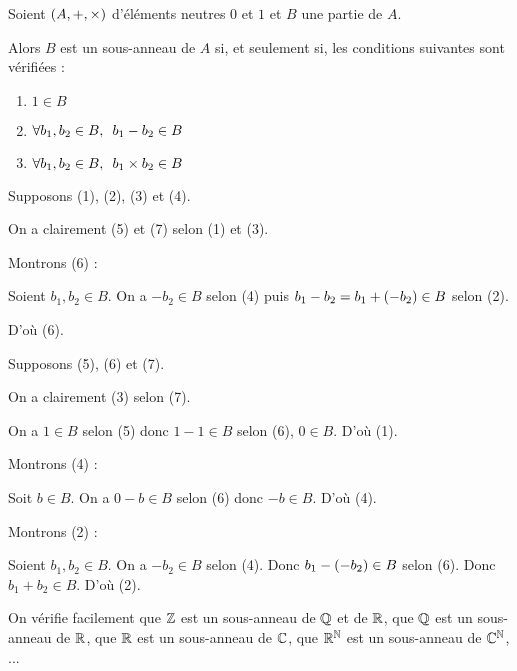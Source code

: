 \begin{prop}
Soient \(\anneau{A}\) d'éléments neutres \(0\) et \(1\) et \(B\) une partie de \(A\).

Alors \(B\) est un sous-anneau de \(A\) si, et seulement si, les conditions suivantes sont vérifiées :

\begin{enumerate}[resume=sousanneau]
\item \(1\in B\) \\

\item \(\quantifs{\forall b_1,b_2\in B}b_1-b_2\in B\) \\

\item \(\quantifs{\forall b_1,b_2\in B}b_1\times b_2\in B\) \\
\end{enumerate}
\end{prop}

\begin{dem}
\impdir

Supposons (1), (2), (3) et (4).

On a clairement (5) et (7) selon (1) et (3).

Montrons (6) :

Soient \(b_1,b_2\in B\). On a \(-b_2\in B\) selon (4) puis \(b_1-b_2=b_1+\left(-b_2\right)\in B\) selon (2).

D'où (6).

\imprec

Supposons (5), (6) et (7).

On a clairement (3) selon (7).

On a \(1\in B\) selon (5) donc \(1-1\in B\) selon (6), \cad \(0\in B\). D'où (1).

Montrons (4) :

Soit \(b\in B\). On a \(0-b\in B\) selon (6) donc \(-b\in B\). D'où (4).

Montrons (2) :

Soient \(b_1,b_2\in B\). On a \(-b_2\in B\) selon (4). Donc \(b_1-\left(-b_2\right)\in B\) selon (6). Donc \(b_1+b_2\in B\). D'où (2).
\end{dem}

\begin{ex}
On vérifie facilement que \(\mathbb{Z}\) est un sous-anneau de \(\mathbb{Q}\) et de \(\mathbb{R}\), que \(\mathbb{Q}\) est un sous-anneau de \(\mathbb{R}\), que \(\mathbb{R}\) est un sous-anneau de \(\mathbb{C}\), que \(\mathbb{R}^{\mathbb{N}}\) est un sous-anneau de \(\mathbb{C}^{\mathbb{N}}\), ...
\end{ex}

